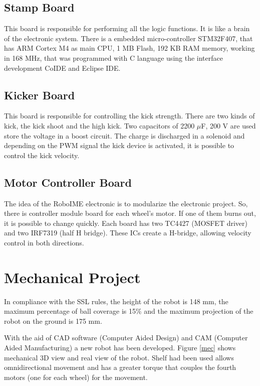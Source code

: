 \documentclass{llncs}
\begin{document}
\subsection{Stamp Board}
This board is responsible  for performing all the logic functions. It is like a brain of the electronic system. There is a embedded micro-controller STM32F407, that has ARM Cortex M4 as main CPU, 1 MB Flash, 192 KB RAM memory, working in 168 MHz, that was programmed with C language using the  interface development CoIDE and Eclipse IDE.

\subsection{Kicker Board}
This board is responsible for controlling the kick strength. There are two kinds of kick,
the kick shoot and the high kick. Two capacitors of 2200 $\mu$F, 200 V are used store the
voltage in a boost circuit. The charge is discharged in a solenoid and depending on the PWM
signal the kick device is activated, it is possible to control the kick velocity.


\subsection{Motor Controller Board}
The idea of the RoboIME electronic is to modularize the electronic project. So, there
is controller module board for each wheel's motor. If one of them burns out, it is
possible to change quickly. Each board has two TC4427 (MOSFET driver) and two
IRF7319 (half H bridge). These ICs create a H-bridge, allowing velocity control in
both directions.

\section{Mechanical Project}

In compliance with the SSL rules, the height of the robot is 148 mm, the maximum
percentage of ball coverage is 15\% and the maximum projection of the robot on the ground is 175 mm.

With the aid of CAD software (Computer Aided Design) and CAM (Computer Aided
Manufacturing) a new robot has been developed. Figure \ref{mec} shows mechanical
3D view and real view of the robot. Shelf had been used allows omnidirectional
movement and has a greater torque that couples the fourth motors (one for each
wheel) for the movement.
\end{document}
